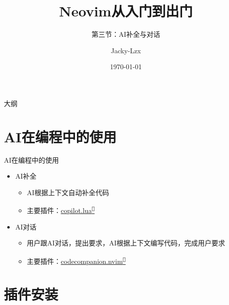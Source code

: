 \documentclass[aspectratio=169]{ctexbeamer}
\title{Neovim从入门到出门}
\subtitle{第三节：AI补全与对话}
\author{Jacky-Lzx}
\date{\today}
\newcommand{\nerd}[1]{\texttt{#1}}
\newcommand{\link}[3][]{\href{#3}{#2\textsuperscript{\nerd{}}}}
\begin{document}
\begin{frame}
  \titlepage
\end{frame}

\begin{frame}{大纲}
  \tableofcontents
\end{frame}

\section{AI在编程中的使用}
  \begin{frame}{AI在编程中的使用}
    \begin{itemize}
      \item AI补全
        \begin{itemize}
          \item AI根据上下文自动补全代码
          \item 主要插件：\link{copilot.lua}{https://github.com/zbirenbaum/copilot.lua}
        \end{itemize}
      \item AI对话
        \begin{itemize}
          \item 用户跟AI对话，提出要求，AI根据上下文编写代码，完成用户要求
          \item 主要插件：\link{codecompanion.nvim}{https://github.com/olimorris/codecompanion.nvim}
        \end{itemize}
    \end{itemize}
  \end{frame}

\section{插件安装}
\end{document}
